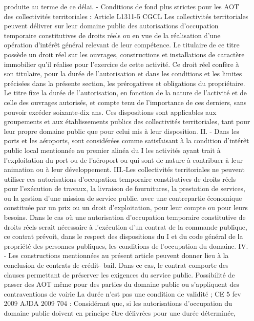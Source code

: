 \documentclass[11pt,a4paper]{report}
\begin{document}
produite au terme de ce délai.
- Conditions de fond plus strictes pour les AOT des collectivités territoriales : Article L1311-5 CGCL
Les collectivités territoriales peuvent délivrer sur leur domaine public des autorisations d'occupation temporaire
constitutives de droits réels ou en vue de la réalisation d'une opération d'intérêt général relevant de leur
compétence. Le titulaire de ce titre possède un droit réel sur les ouvrages, constructions et installations de
caractère immobilier qu'il réalise pour l'exercice de cette activité.
Ce droit réel confère à son titulaire, pour la durée de l'autorisation et dans les conditions et les limites précisées
dans la présente section, les prérogatives et obligations du propriétaire.
Le titre fixe la durée de l'autorisation, en fonction de la nature de l'activité et de celle des ouvrages autorisés, et
compte tenu de l'importance de ces derniers, sans pouvoir excéder soixante-dix ans.
Ces dispositions sont applicables aux groupements et aux établissements publics des collectivités territoriales,
tant pour leur propre domaine public que pour celui mis à leur disposition.
II. - Dans les ports et les aéroports, sont considérées comme satisfaisant à la condition d'intérêt public local
mentionnée au premier alinéa du I les activités ayant trait à l'exploitation du port ou de l'aéroport ou qui sont de
nature à contribuer à leur animation ou à leur développement.
III.-Les collectivités territoriales ne peuvent utiliser ces autorisations d'occupation temporaire constitutives de
droits réels pour l'exécution de travaux, la livraison de fournitures, la prestation de services, ou la gestion d'une
mission de service public, avec une contrepartie économique constituée par un prix ou un droit d'exploitation,
pour leur compte ou pour leurs besoins.
Dans le cas où une autorisation d'occupation temporaire constitutive de droits réels serait nécessaire à
l'exécution d'un contrat de la commande publique, ce contrat prévoit, dans le respect des dispositions du I et du
code général de la propriété des personnes publiques, les conditions de l'occupation du domaine.
IV. - Les constructions mentionnées au présent article peuvent donner lieu à la conclusion de contrats de crédit-
bail. Dans ce cas, le contrat comporte des clauses permettant de préserver les exigences du service public.
Possibilité de passer des AOT même pour des parties du domaine public ou s’appliquent des contraventions de
voirie
La durée n’est pas une condition de validité ; CE 5 fev 2009  AJDA 2009 704 : Considérant que, si les
autorisations d'occupation du domaine public doivent en principe être délivrées pour une durée déterminée,
\end{document}
